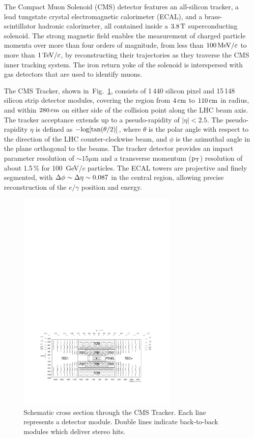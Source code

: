 \documentclass[a4paper]{jpconf}
\begin{document}
The Compact Muon Solenoid (CMS) detector features an all-silicon tracker, a lead tungstate crystal electromagnetic calorimeter (ECAL), and a brass-scintillator hadronic calorimeter, all contained inside a  $3.8\,{\rm T}$  superconducting solenoid.
The strong magnetic field  enables the measurement of charged
particle momenta over more than four orders of magnitude, from less than
$100{\rm \, MeV}/c$ to more than $1{\rm \, TeV}/c$, by reconstructing their trajectories as they
traverse the CMS inner tracking system.  
The iron return yoke of the solenoid is interspersed with gas detectors that are used to identify muons.


The CMS Tracker, shown
in~Fig.~\ref{fig:tklayout}, consists of 1\,440 silicon pixel and 15\,148 silicon strip detector modules, covering
the region from $4\rm \, cm$ to $110\rm \, cm$ in radius, and within $280\rm \, cm$ on either
side of the collision point along the LHC beam axis. The tracker
acceptance extends up to a pseudo-rapidity of $\left | \eta \right | < 2.5$.
The pseudo-rapidity $\eta$ is defined as $\rm  -log[tan(\theta/2)]$, where $\theta$ is the polar angle with respect to the direction of the LHC counter-clockwise beam, and $\phi$ is the azimuthal angle in the plane orthogonal to the beams.
The tracker detector  provides an impact parameter resolution of $\sim 15 \mu$m and a transverse momentum ($\rm p_{T}$) resolution of about 1.5\,\% for 100~GeV/$c$ particles.
The ECAL towers are projective and finely segmented, with $\rm \Delta\phi \sim \Delta\eta \sim 0.087$ in the central region, allowing precise reconstruction of the $e/\gamma$ position and energy.  

\begin{figure}[h!]
  \begin{center}
    \includegraphics[width=0.7\textwidth]{fig/general_layout.pdf}
    \caption{Schematic cross section through the CMS Tracker. Each line represents a detector module. Double lines indicate back-to-back modules which deliver stereo hits.}
    \label{fig:tklayout}
  \end{center}
\end{figure}
\end{document}
